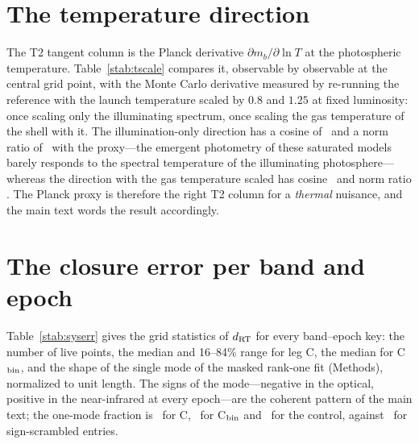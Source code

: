 \documentclass[11pt]{article}
\newcommand{\Cboth}{C\xspace}
\newcommand{\Cbin}{C$_{\rm bin}$\xspace}
\newcommand{\dRT}{d_{\rm RT}}
\begin{document}
\section{The temperature direction}\label{ssec:tscale}

The T2 tangent column is the Planck derivative $\partial m_b/\partial\ln T$ at the photospheric temperature. Table~\ref{stab:tscale} compares it, observable by observable at the central grid point, with the Monte Carlo derivative measured by re-running the reference with the launch temperature scaled by $0.8$ and $1.25$ at fixed luminosity: once scaling only the illuminating spectrum, once scaling the gas temperature of the shell with it. The illumination-only direction has a cosine of \IllumCos\ and a norm ratio of \IllumNorm\ with the proxy---the emergent photometry of these saturated models barely responds to the spectral temperature of the illuminating photosphere---whereas the direction with the gas temperature scaled has cosine \GasCos\ and norm ratio \GasNorm. The Planck proxy is therefore the right T2 column for a \emph{thermal} nuisance, and the main text words the result accordingly.

\begin{table}[h]
\centering
\caption{\textbf{Monte Carlo temperature derivatives against the Planck proxy at the central point.} Derivatives are $\partial m/\partial\ln T$ in magnitudes per unit $\ln T$, at fixed luminosity, on the live observables of the point; the last two rows give the $1/\sigma^2$-weighted cosine and norm ratio of each Monte Carlo direction with the proxy.}
\label{stab:tscale}
\small

\end{table}

\clearpage
\section{The closure error per band and epoch}\label{ssec:syserr}

Table~\ref{stab:syserr} gives the grid statistics of $\dRT$ for every band--epoch key: the number of live points, the median and 16--84\% range for leg \Cboth, the median for \Cbin, and the shape of the single mode of the masked rank-one fit (Methods), normalized to unit length. The signs of the mode---negative in the optical, positive in the near-infrared at every epoch---are the coherent pattern of the main text; the one-mode fraction is \SysOneMode\ for \Cboth, \SysBinnedOneMode\ for \Cbin and \SysControlOneMode\ for the control, against \SysNullMedian\ for sign-scrambled entries.

\begin{table}[h]
\centering
\caption{\textbf{The closure error of leg \Cboth per band--epoch key over the grid.} $n$ is the number of grid points at which the key is live; keys with $n<5$ are greyed in Fig.~4b of the main text.}
\label{stab:syserr}
\footnotesize

\end{table}
\end{document}
